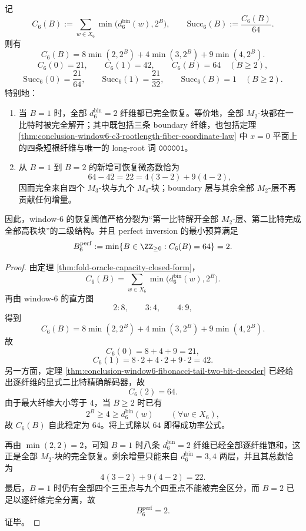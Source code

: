 \begin{theorem}\label{thm:conclusion-window6-exact-reversible-capacity-curve}
记
\[
C_6(B):=\sum_{w\in X_6}\min\bigl(d_6^{\mathrm{bin}}(w),2^B\bigr),
\qquad
\mathrm{Succ}_6(B):=\frac{C_6(B)}{64}.
\]
则有
\[
C_6(B)=8\min(2,2^B)+4\min(3,2^B)+9\min(4,2^B).
\]
\[
C_6(0)=21,\qquad
C_6(1)=42,\qquad
C_6(B)=64\quad (B\ge 2),
\]
\[
\mathrm{Succ}_6(0)=\frac{21}{64},\qquad
\mathrm{Succ}_6(1)=\frac{21}{32},\qquad
\mathrm{Succ}_6(B)=1\quad (B\ge 2).
\]
特别地：
\begin{enumerate}
  \item 当 \(B=1\) 时，全部 \(d_6^{\mathrm{bin}}=2\) 纤维都已完全恢复。等价地，全部 \(M_2\)-块都在一比特时被完全解开；其中既包括三条 boundary 纤维，也包括定理 \ref{thm:conclusion-window6-c3-rootlength-fiber-coordinate-law} 中 \(x=0\) 平面上的四条短根纤维与唯一的 long-root 词 \(\mathtt{000001}\)。
  \item 从 \(B=1\) 到 \(B=2\) 的新增可恢复微态数恰为
  \[
  64-42=22=4(3-2)+9(4-2),
  \]
  因而完全来自四个 \(M_3\)-块与九个 \(M_4\)-块；boundary 层与其余全部 \(M_2\)-层不再贡献任何增量。
\end{enumerate}
因此，window-\(6\) 的恢复阈值严格分裂为“第一比特解开全部 \(M_2\)-层、第二比特完成全部高秩块”的二级结构。并且 perfect inversion 的最小预算满足
\[
B_6^{\mathrm{perf}}
:=
\min\{B\in\ZZ_{\ge 0}: C_6(B)=64\}
=2.
\]
\end{theorem}
\begin{proof}
由定理 \ref{thm:fold-oracle-capacity-closed-form}，
\[
C_6(B)=\sum_{w\in X_6}\min\bigl(d_6^{\mathrm{bin}}(w),2^B\bigr).
\]
再由 window-\(6\) 的直方图
\[
2:8,\qquad 3:4,\qquad 4:9,
\]
得到
\[
C_6(B)=8\min(2,2^B)+4\min(3,2^B)+9\min(4,2^B).
\]
故
\[
C_6(0)=8+4+9=21,
\]
\[
C_6(1)=8\cdot 2+4\cdot 2+9\cdot 2=42.
\]
另一方面，定理 \ref{thm:conclusion-window6-fibonacci-tail-two-bit-decoder} 已经给出逐纤维的显式二比特精确解码器，故
\[
C_6(2)=64.
\]
由于最大纤维大小等于 \(4\)，当 \(B\ge 2\) 时已有
\[
2^B\ge 4\ge d_6^{\mathrm{bin}}(w)
\qquad (\forall w\in X_6),
\]
故 \(C_6(B)\) 自此稳定为 \(64\)。将上式除以 \(64\) 即得成功率公式。

再由 \(\min(2,2)=2\)，可知 \(B=1\) 时八条 \(d_6^{\mathrm{bin}}=2\) 纤维已经全部逐纤维饱和，这正是全部 \(M_2\)-块的完全恢复。剩余增量只能来自 \(d_6^{\mathrm{bin}}=3,4\) 两层，并且其总数恰为
\[
4(3-2)+9(4-2)=22.
\]
最后，\(B=1\) 时仍有全部四个三重点与九个四重点不能被完全区分，而 \(B=2\) 已足以逐纤维完全分离，故
\[
B_6^{\mathrm{perf}}=2.
\]
证毕。
\end{proof}

